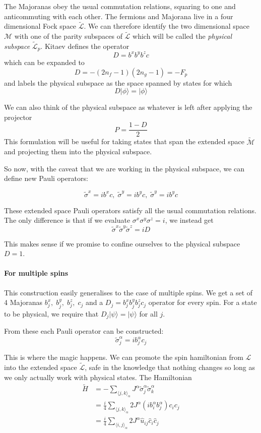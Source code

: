 The Majoranas obey the usual commutation relations, squaring to one and anticommuting with each other. The fermions and Majorana live in a four dimensional Fock space \(\mathcal{\tilde{L}}\). We can therefore identify the two dimensional space \(\mathcal{M}\) with one of the parity subspaces of \(\mathcal{\tilde{L}}\) which will be called the \emph{physical subspace} \(\mathcal{\tilde{L}}_p\). Kitaev defines the operator \[D = b^xb^yb^zc\] which can be expanded to \[D = -(2n_f - 1)(2n_g - 1) = -F_p\] and labels the physical subspace as the space spanned by states for which \[ D|\phi\rangle = |\phi\rangle\]

We can also think of the physical subspace as whatever is left after applying the projector \[P  = \frac{1 - D}{2}\] This formulation will be useful for taking states that span the extended space \(\mathcal{\tilde{M}}\) and projecting them into the physical subspace.

So now, with the caveat that we are working in the physical subspace, we can define new Pauli operators:

\[\tilde{\sigma}^x = i b^x c,\; \tilde{\sigma}^y = i b^y c,\; \tilde{\sigma}^y = i b^y c\]

These extended space Pauli operators satisfy all the usual commutation relations. The only difference is that if we evaluate \(\sigma^x \sigma^y \sigma^z = i\), we instead get \[ \tilde{\sigma}^x\tilde{\sigma}^y\tilde{\sigma}^z = iD \]

This makes sense if we promise to confine ourselves to the physical subspace \(D = 1\).

\hypertarget{for-multiple-spins}{%
\paragraph{For multiple spins}\label{for-multiple-spins}}

This construction easily generalises to the case of multiple spins. We get a set of 4 Majoranas \(b^x_j,\; b^y_j,\;b^z_j,\; c_j\) and a \(D_j = b^x_jb^y_jb^z_jc_j\) operator for every spin. For a state to be physical, we require that \(D_j |\psi\rangle = |\psi\rangle\) for all \(j\).

From these each Pauli operator can be constructed: \[\tilde{\sigma}^\alpha_j = i b^\alpha_j c_j\]

This is where the magic happens. We can promote the spin hamiltonian from \(\mathcal{L}\) into the extended space \(\mathcal{\tilde{L}}\), safe in the knowledge that nothing changes so long as we only actually work with physical states. The Hamiltonian \[\begin{aligned}
\tilde{H} &=  - \sum_{\langle j,k\rangle_\alpha} J^{\alpha}\tilde{\sigma}_j^{\alpha}\tilde{\sigma}_k^{\alpha}\\
          &= \frac{i}{4} \sum_{\langle j,k\rangle_\alpha} 2J^{\alpha} (ib^\alpha_i b^\alpha_j) c_i c_j\\
          &=  \frac{i}{4} \sum_{\langle i,j\rangle_\alpha} 2J^{\alpha} \hat{u}_{ij} \hat{c}_i \hat{c}_j
\end{aligned}\]

